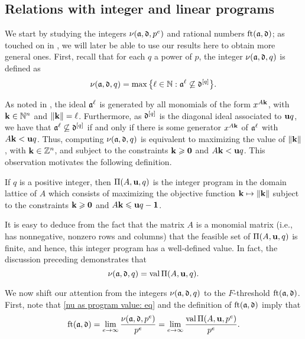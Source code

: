 \documentclass[11pt]{amsart}
\begin{document}
\subsection{Relations with integer and linear programs}  We start by studying the integers $\nu(\mathfrak{a}, \mathfrak{d}, p^e)$ and rational numbers $\operatorname{ft}(\mathfrak{a}, \mathfrak{d})$; as touched on in , we will later be able to use our results here to obtain more general ones. 
First, recall that for each $q$ a power of $p$, the integer $\nu(\mathfrak{a}, \mathfrak{d}, q)$ is defined as 
\[\nu(\mathfrak{a},\mathfrak{d},q) = \max\big\{\ell \in \mathbb{N} : \mathfrak{a}^{\ell} \not\subseteq \mathfrak{d}^{[q]}\big\}.\]

As noted in ,  the ideal $\mathfrak{a}^{\ell}$ is generated by all monomials of the form $x^{A\mathbf{k}}$, with $\mathbf{k}\in \mathbb{N}^n$ and $\| \mathbf{k} \| = \ell$.  Furthermore, as $\mathfrak{d}^{[q]}$ is the diagonal ideal associated to $\mathbf{u}q$, we have that $\mathfrak{a}^{\ell} \not\subseteq \mathfrak{d}^{[q]}$ if and only if there is some generator $x^{A \mathbf{k}}$ of $\mathfrak{a}^{\ell}$ with $A\mathbf{k} < \mathbf{u}q$.  Thus, computing $\nu(\mathfrak{a},\mathfrak{d},q)$ is equivalent to maximizing the value of $\| \mathbf{k} \|$, with $\mathbf{k} \in \mathbb{Z}^n$, and subject to the constraints $\mathbf{k} \geqslant \mathbf{0}$ and $A\mathbf{k} < \mathbf{u}q$.
This observation motivates the following definition.

\begin{definition}
\label{IP: D}
   If $q$ is a positive integer, then $\Pi(A, \mathbf{u}, q)$ is the integer program in the domain lattice of $A$ which consists of maximizing the objective function $\mathbf{k} \mapsto \| \mathbf{k} \|$ subject to the constraints $\mathbf{k} \geqslant \mathbf{0}$ and $A \mathbf{k} \leqslant \mathbf{u}q - \mathbf{1}$.
\end{definition}

It is easy to deduce from the fact that the matrix $A$ is a monomial matrix (i.e., has nonnegative, nonzero rows and columns) that the feasible set of $\Pi(A,\mathbf{u},q)$ is finite, and hence, this integer program has a well-defined value.  In fact, the discussion preceding  demonstrates that 
%
\begin{equation}
\label{nu as program value: eq}
\nu(\mathfrak{a},\mathfrak{d},q) = \operatorname{val} \Pi(A,\mathbf{u},q).
\end{equation}



We now shift our attention from the integers $\nu(\mathfrak{a}, \mathfrak{d}, q)$ to the $F$-threshold $\operatorname{ft}(\mathfrak{a}, \mathfrak{d})$.  First, note that \eqref{nu as program value: eq} and the definition of $\operatorname{ft}(\mathfrak{a}, \mathfrak{d})$ imply that 
%
\begin{equation}
\label{ft as limit of normalized program values: eq}
\operatorname{ft}(\mathfrak{a}, \mathfrak{d}) = \lim_{e\to\infty} \frac{\nu(\mathfrak{a},\mathfrak{d},p^e)}{p^e} = \lim_{e\to\infty} \frac{\operatorname{val} \Pi(A,\mathbf{u},p^e)}{p^e}.
\end{equation}
\end{document}
